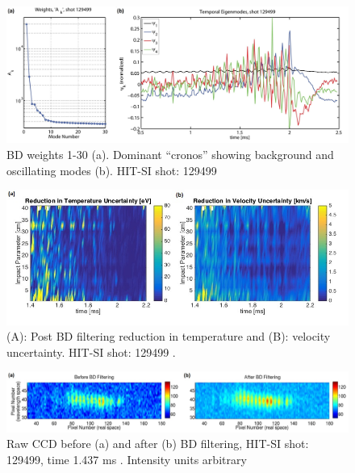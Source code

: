 	\begin{center}
		\begin{figure}
			\includegraphics[width=6in]{BDWeight_1}\caption{BD weights 1-30 (a). Dominant ``cronos'' showing background and oscillating modes (b). HIT-SI shot: 129499 \cite{hossack2015study}}\label{BD Weight}
		\end{figure}

		\begin{figure}
			\includegraphics[width=6in]{BD_Uncertainty_1}\caption{(A): Post BD filtering reduction in temperature and (B): velocity uncertainty. HIT-SI shot: 129499 \cite{hossack2015study}.}\label{BD Uncertainty}
		\end{figure}
		\begin{figure}
			\includegraphics[width=6in]{CCD_BD_1}\caption{Raw CCD before (a) and after (b) BD filtering, HIT-SI shot: 129499, time 1.437 ms \cite{hossack2015study}. Intensity units arbitrary}\label{BD CCD}
			

\end{figure}
\end{center}
